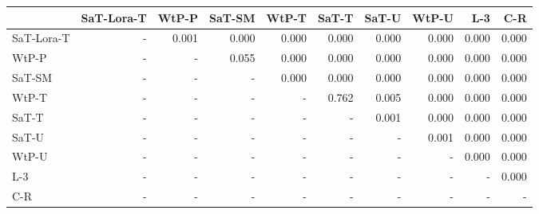 \begin{tabular}{lrrrrrrrrr}
\toprule
 & SaT-Lora-T & WtP-P & SaT-SM & WtP-T & SaT-T & SaT-U & WtP-U & L-3 & C-R \\
\midrule
SaT-Lora-T & - & 0.001 & 0.000 & 0.000 & 0.000 & 0.000 & 0.000 & 0.000 & 0.000 \\
WtP-P & - & - & 0.055 & 0.000 & 0.000 & 0.000 & 0.000 & 0.000 & 0.000 \\
SaT-SM & - & - & - & 0.000 & 0.000 & 0.000 & 0.000 & 0.000 & 0.000 \\
WtP-T & - & - & - & - & 0.762 & 0.005 & 0.000 & 0.000 & 0.000 \\
SaT-T & - & - & - & - & - & 0.001 & 0.000 & 0.000 & 0.000 \\
SaT-U & - & - & - & - & - & - & 0.001 & 0.000 & 0.000 \\
WtP-U & - & - & - & - & - & - & - & 0.000 & 0.000 \\
L-3 & - & - & - & - & - & - & - & - & 0.000 \\
C-R & - & - & - & - & - & - & - & - & - \\
\bottomrule
\end{tabular}

